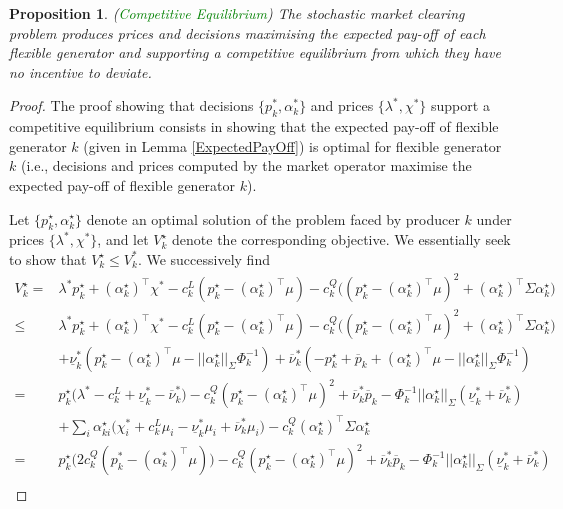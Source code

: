 \documentclass{article}
\newtheorem{proposition}{Proposition}
\begin{document}
\begin{proposition}
(\textcolor{green}{Competitive Equilibrium}) The stochastic market clearing problem produces prices and decisions maximising the expected pay-off of each flexible generator and supporting a competitive equilibrium from which they have no incentive to deviate.
\end{proposition}
\begin{proof}
The proof showing that decisions $\{p_k^*, \alpha_k^*\}$ and prices $\{\lambda^*, \chi^*\}$ support a competitive equilibrium consists in showing that the expected pay-off of flexible generator $k$ (given in Lemma \ref{ExpectedPayOff}) is optimal for flexible generator $k$ (i.e., decisions and prices computed by the market operator maximise the expected pay-off of flexible generator $k$).

Let $\{p_k^\star, \alpha_k^\star\}$ denote an optimal solution of the problem faced by producer $k$ under prices $\{\lambda^*, \chi^*\}$, and let $V_k^\star$ denote the corresponding objective. We essentially seek to show that $V_k^\star \le V_k^*$. We successively find
\begin{align*}
    V_k^\star =& \lambda^*p_k^\star + (\alpha_k^\star)^\top \chi^* - c_k^L(p_k^\star - (\alpha_k^\star)^\top \mu) - c_k^Q\big((p_k^\star - (\alpha_k^\star)^\top \mu)^2 + (\alpha_k^\star)^\top \Sigma \alpha_k^\star\big)\\
    \le& \lambda^*p_k^\star + (\alpha_k^\star)^\top \chi^* - c_k^L(p_k^\star - (\alpha_k^\star)^\top \mu) - c_k^Q\big((p_k^\star - (\alpha_k^\star)^\top \mu)^2 + (\alpha_k^\star)^\top \Sigma \alpha_k^\star\big)\\
    &+ \underline{\nu}_k^*(p_k^\star - (\alpha_k^\star)^\top \mu - ||\alpha_k^\star||_{\Sigma} \Phi_k^{-1}) + \overline{\nu}_k^* (-p_k^\star + \overline{p}_k + (\alpha_k^\star)^\top \mu - ||\alpha_k^\star||_{\Sigma} \Phi_k^{-1})\\
    =& p_k^\star\big(\lambda^* - c_k^L + \underline{\nu}_k^* - \overline{\nu}_k^*\big) - c_k^Q(p_k^\star - (\alpha_k^\star)^\top \mu)^2 + \overline{\nu}_k^* \overline{p}_k - \Phi_k^{-1} ||\alpha_k^\star||_\Sigma (\underline{\nu}_k^* + \overline{\nu}_k^*)\\
    &+ \sum_i \alpha_{ki}^\star\big(\chi_i^* + c_k^L \mu_i - \underline{\nu}_k^* \mu_i + \overline{\nu}_k^* \mu_i\big) - c_k^Q (\alpha_k^\star)^\top \Sigma \alpha_k^\star \\
   =& p_k^\star\big(2c_k^Q(p_k^* - (\alpha_k^*)^\top \mu)\big) - c_k^Q(p_k^\star - (\alpha_k^\star)^\top \mu)^2 + \overline{\nu}_k^* \overline{p}_k - \Phi_k^{-1} ||\alpha_k^\star||_\Sigma (\underline{\nu}_k^* + \overline{\nu}_k^*)\\    

\end{align*}
\end{proof}
\end{document}
